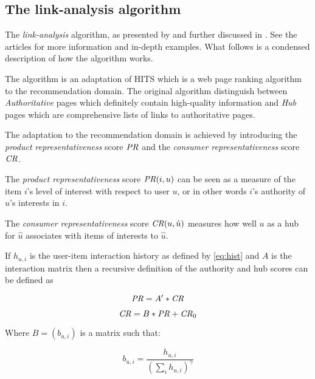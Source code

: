 \subsection{The link-analysis algorithm}\label{sec:background:theory:linkanalysis}


The \textit{link-analysis} algorithm, as presented by \cite{huang2004link} and further discussed in \cite{huang2007comparison}. See the articles for more information and in-depth examples. What follows is a condensed description of how the algorithm works.

The algorithm is an adaptation of HITS \cite{kleinberg1999authoritative} which is a web page ranking algorithm to the recommendation domain. The original algorithm distinguish between \textit{Authoritative} pages which definitely contain high-quality information and \textit{Hub} pages which are comprehensive lists of links to authoritative pages. \citep{huang2007comparison}

The adaptation to the recommendation domain is achieved by introducing the \textit{product representativeness} score $\mathit{PR}$ and the \textit{consumer representativeness} score $\mathit{CR}$.

The \textit{product representativeness} score $\mathit{PR}(i, u)$ can be seen as a measure of the item $i$'s level of interest with respect to user $u$, or in other words $i$'s authority of $u$'s interests in $i$.

The \textit{consumer representativeness} score $\mathit{CR}(u, \hat{u})$ measures how well $u$ as a hub for $\hat{u}$ associates with items of interests to $\hat{u}$.

If $h_{u, i}$ is the user-item interaction history as defined by \ref{eq:hist} and $A$ is the interaction matrix then a recursive definition of the authority and hub scores can be defined as

\begin{equation}
    \mathit{PR} = A' * \mathit{CR}
\end{equation}

\begin{equation}
    \mathit{CR} = B * \mathit{PR} + \mathit{CR}_0
\end{equation}

Where $B = (b_{u, i})$ is a matrix such that:

\begin{equation}
    b_{u, i} = \frac{ h_{u, i} }{ \left(\sum_{i} h_{u, i}\right)^\gamma }
\end{equation}

